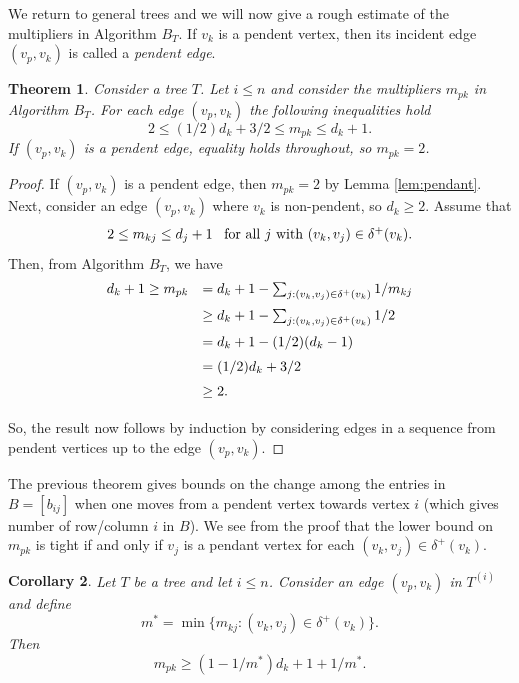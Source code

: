 \documentclass[12pt]{article}
\newtheorem{theorem}{Theorem}[section]
\newtheorem{corollary}[theorem]{Corollary}
\begin{document}
\medskip
We return to general trees and we will now give a rough estimate of the multipliers in Algorithm $B_T$. If $v_k$ is a pendent vertex, then its incident edge $(v_p,v_k)$ is called a {\em pendent edge}.  

\begin{theorem}
  \label{thm:mult-prop}
  Consider a tree $T$. Let $i \le n$ and consider the multipliers $m_{pk}$ in Algorithm $B_T$. For each edge $(v_p,v_k)$ the following inequalities hold 
  \begin{equation}
    \label{eq:B-ineq}
     2 \le (1/2)d_k+3/2 \le m_{pk} \le d_k+1.
  \end{equation}
  If $(v_p,v_k)$ is a pendent edge, equality holds throughout, so $m_{pk}=2$.
\end{theorem}
%
\begin{proof}
 If $(v_p,v_k)$ is a pendent edge, then $m_{pk}=2$ by Lemma \ref{lem:pendant}.  Next, consider an edge $(v_p,v_k)$ where $v_k$ is non-pendent, so $d_k\ge 2$.  
 Assume that 
 \[
     2 \le  m_{kj} \le d_j+1 \;\;\; \mbox{\rm for all $j$ with $(v_k,v_j) \in \delta^+(v_k)$.}
 \]
 Then, from Algorithm $B_T$, we have 
 \[
 \begin{array}{ll} \vspace{0.2cm}
    d_k+1\ge m_{pk}&=d_k+1-\sum_{j:(v_k,v_j)\in \delta^+(v_k)} 1/m_{kj} \\ \vspace{0.2cm}
       &\ge d_k+1-\sum_{j:(v_k,v_j)\in \delta^+(v_k)} 1/2 \\ \vspace{0.2cm}
       &= d_k+1-(1/2)(d_k-1) \\ \vspace{0.2cm}
       &=(1/2)d_k+3/2 \\ \vspace{0.2cm}
       &\ge 2.
 \end{array}   
 \]
 So, the result now follows by induction by considering edges in a sequence from pendent vertices up to the edge $(v_p,v_k)$.
\end{proof}

The previous theorem gives bounds on the change among the entries in $B=[b_{ij}]$ when one moves from a pendent vertex towards vertex $i$ (which gives number of row/column $i$ in $B$). We see from the proof that the lower bound on $m_{pk}$ is tight if and only if $v_j$ is a pendant vertex for each $(v_k,v_j) \in \delta^+(v_k)$.

\begin{corollary}
  \label{cor:mult-prop3}
  Let $T$ be a tree and let $i \le n$. Consider an edge $(v_p,v_k)$ in $T^{(i)}$ and define 
  \[
     m^*=\min\{m_{kj}: (v_k,v_j) \in \delta^+(v_k)\}.
  \]
  Then 
  \begin{equation}
  \label{eq:B-ineq2}
      m_{pk} \ge (1-1/m^*)d_k+1+1/m^*.
  \end{equation}
 
\end{corollary}
\end{document}
